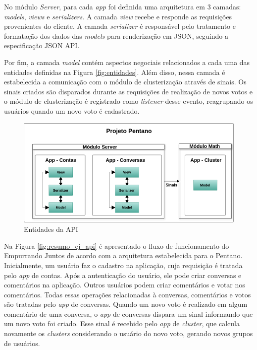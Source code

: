 No módulo \textit{Server}, para cada \textit{app} foi definida uma arquitetura
em 3 camadas: \textit{models}, \textit{views} e \textit{serializers}.
A camada \textit{view} recebe e responde as requisições provenientes do cliente.
A camada \textit{serializer} é responsável pelo tratamento e formatação dos dados das \textit{models}
para renderização em JSON, seguindo a especificação JSON API.

Por fim, a camada \textit{model} contém aspectos negociais relacionados a cada uma das entidades definidas na 
Figura \ref{fig:entidades}. Além disso, nessa camada é estabelecida a comunicação com o módulo de clusterização através de sinais.
Os sinais criados são disparados durante as requisições de realização de novos votos e o módulo de clusterização é registrado
como \textit{listener} desse evento, reagrupando os usuários quando um novo voto é cadastrado.

\begin{figure}[h!]
\centering
\includegraphics[scale=0.5]{figuras/arquitetura_api.png}
\caption{Entidades da API}
\label{fig:arquitetura_api}
\end{figure}

Na Figura \ref{fig:resumo_ej_api} é apresentado o fluxo de funcionamento do Empurrando Juntos de acordo com a arquitetura
estabelecida para o Pentano. Inicialmente, um usuário faz o cadastro na aplicação, cuja requisição é tratada pelo \textit{app} de contas.
Após a autenticação do usuário, ele pode criar conversas e comentários na aplicação. Outros usuários podem criar comentários e votar
nos comentários. Todas essas operações relacionadas à conversas, comentários e votos são tratadas pelo \textit{app} de conversas.
Quando um novo voto é realizado em algum comentário de uma conversa, o \textit{app} de conversas dispara um sinal informando que um novo
voto foi criado. Esse sinal é recebido pelo \textit{app} de \textit{cluster}, que calcula novamente os \textit{clusters} considerando
o usuário do novo voto, gerando novos grupos de usuários.

